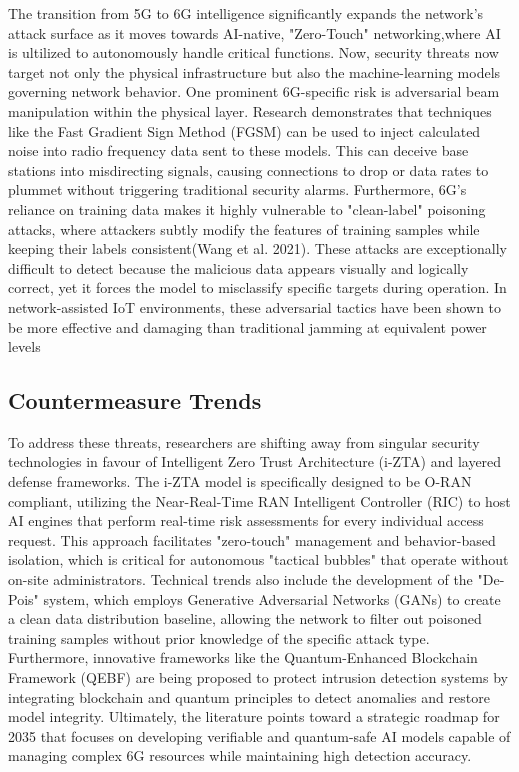 \documentclass[letterpaper]{article} %
\begin{document}
The transition from 5G to 6G intelligence significantly expands the network's attack surface as it moves towards AI-native, "Zero-Touch" networking,where AI is ultilized to autonomously handle critical functions. Now, security threats now target not only the physical infrastructure but also the machine-learning models governing network behavior. 
One prominent 6G-specific risk is adversarial beam manipulation within the physical layer. Research demonstrates that techniques like the Fast Gradient Sign Method (FGSM) can be used to inject calculated noise into radio frequency data sent to these models. This can deceive base stations into misdirecting signals, causing connections to drop or data rates to plummet without triggering traditional security alarms\cite{Catak_Catak_Moldsvor_2021}. Furthermore, 6G's reliance on training data makes it highly vulnerable to "clean-label" poisoning attacks, where attackers subtly modify the features of training samples while keeping their labels consistent(Wang et al. 2021). These attacks are exceptionally difficult to detect because the malicious data appears visually and logically correct, yet it forces the model to misclassify specific targets during operation. In network-assisted IoT environments, these adversarial tactics have been shown to be more effective and damaging than traditional jamming at equivalent power levels\cite{son2024}

\subsection{Countermeasure Trends}  

To address these threats, researchers are shifting away from singular security technologies in favour of Intelligent Zero Trust Architecture (i-ZTA) and layered defense frameworks. The i-ZTA model is specifically designed to be O-RAN compliant, utilizing the Near-Real-Time RAN Intelligent Controller (RIC) to host AI engines that perform real-time risk assessments for every individual access request\cite{Ramezanpour_2022}. This approach facilitates "zero-touch" management and behavior-based isolation, which is critical for autonomous "tactical bubbles" that operate without on-site administrators\cite{Suomalainen_2025}. Technical trends also include the development of the "De-Pois" system, which employs Generative Adversarial Networks (GANs) to create a clean data distribution baseline, allowing the network to filter out poisoned training samples without prior knowledge of the specific attack type\cite{Chen_Zhang_Zhang_Wang_Liu_2021}. Furthermore, innovative frameworks like the Quantum-Enhanced Blockchain Framework (QEBF) are being proposed to protect intrusion detection systems by integrating blockchain and quantum principles to detect anomalies and restore model integrity\cite{Rajesh_2025}. Ultimately, the literature points toward a strategic roadmap for 2035 that focuses on developing verifiable and quantum-safe AI models capable of managing complex 6G resources while maintaining high detection accuracy\cite{Kumar_Dutta_Vamsi_Sankararao_Varri_Puthal_2026}.
\end{document}
